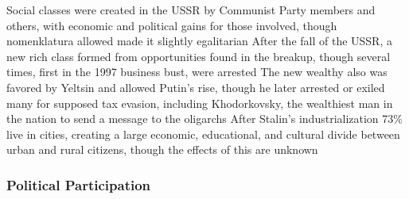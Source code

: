 \documentclass[11 pt, twoside]{article}
\newenvironment{outline*}
{
	\begin{outline}[enumerate]
	}
	{\end{outline}
}
\begin{document}
\begin{outline*}
\1 Social classes were created in the USSR by Communist Party members and others, with economic and political gains for those involved, though nomenklatura allowed made it slightly egalitarian
\2 After the fall of the USSR, a new rich class formed from opportunities found in the breakup, though several times, first in the 1997 business bust, were arrested
\2 The new wealthy also was favored by Yeltsin and allowed Putin's rise, though he later arrested or exiled many for supposed tax evasion, including Khodorkovsky, the wealthiest man in the nation to send a message to the oligarchs
\1 After Stalin's industrialization 73\% live in cities, creating a large economic, educational, and cultural divide between urban and rural citizens, though the effects of this are unknown
\end{outline*}
\subsubsection{Political Participation}
\end{document}
